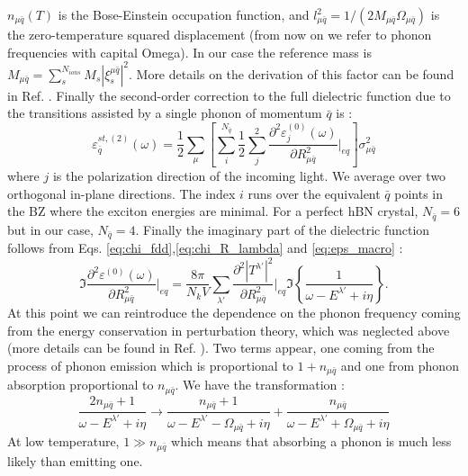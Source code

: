 $n_{\mu\bar{q}}(T)$ is the Bose-Einstein occupation function, and $l^2_{\mu\bar{q}} = 1/(2M_{\mu\bar{q}}\Omega_{\mu\bar{q}})$ is the zero-temperature squared displacement (from now on we refer to phonon frequencies with capital Omega). In our case the reference mass is $M_{\mu\bar{q}} = \sum^{N_{ions}}_s M_s |\xi_s^{\mu\bar{q}}|^2$. More details on the derivation of this factor can be found in Ref. \cite{zacharias2020theory}. Finally the second-order correction to the full dielectric function due to the transitions assisted by a single phonon of momentum $\bar{q}$ is :
\begin{equation}
	\varepsilon^{st,(2)}_{\bar{q}} (\omega) = \frac{1}{2} \sum_\mu \left[ \sum_i^{N_{\bar{q}}} \frac{1}{2} \sum_j^2 \frac{\partial^2 \varepsilon^{(0)}_j(\omega)}{\partial R^2_{\mu\bar{q}}} \biggr|_{eq} \right] \sigma^2_{\mu\bar{q}} \label{eq:eps_Taylor_2nd}
\end{equation}
where $j$ is the polarization direction of the incoming light. We average over two orthogonal in-plane directions. The index $i$ runs over the equivalent $\bar{q}$ points in the \acrshort{BZ} where the exciton energies are minimal. For a perfect \acrshort{hBN} crystal, $N_{\bar{q}} = 6$ but in our case, $N_{\bar{q}} = 4$. 
Finally the imaginary part of the dielectric function follows from Eqs. \eqref{eq:chi_fdd},\eqref{eq:chi_R_lambda} and \eqref{eq:eps_macro} : 
\begin{equation}
	\Im\frac{\partial^2 \varepsilon^{(0)}(\omega)}{\partial R^2_{\mu\bar{q}}}\biggr|_{eq} = \frac{8\pi}{N_k V} \sum_{\lambda'} \frac{\partial^2 |T^{\lambda'}|^2}{\partial R^2_{\mu\bar{q}}}\biggr|_{eq} \Im\left\{ \frac{1}{\omega - E^{\lambda'} + i\eta} \right\}.
\end{equation}
At this point we can reintroduce the dependence on the phonon frequency coming from the energy conservation in perturbation theory, which was neglected above (more details can be found in Ref. \cite{paleari2019first}). Two terms appear, one coming from the process of phonon emission which is proportional to $1 + n_{\mu\bar{q}}$ and one from phonon absorption proportional to $n_{\mu\bar{q}}$. We have the transformation :
\begin{equation}
	\frac{2n_{\mu\bar{q}} + 1}{\omega - E^{\lambda'} + i\eta} \to \frac{n_{\mu\bar{q}} + 1}{\omega - E^{\lambda'} - \Omega_{\mu\bar{q}} + i\eta} + \frac{n_{\mu\bar{q}}}{\omega - E^{\lambda'} + \Omega_{\mu\bar{q}} + i\eta}
\end{equation}
At low temperature, $1 \gg n_{\mu\bar{q}}$ which means that absorbing a phonon is much less likely than emitting one. 
